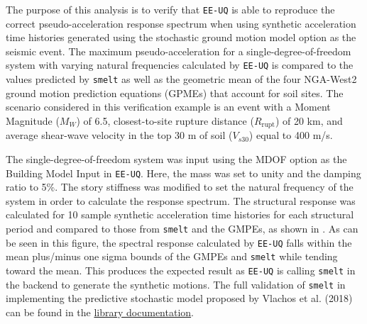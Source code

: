 The purpose of this analysis is to verify that \texttt{EE-UQ} is able
to reproduce the correct pseudo-acceleration response spectrum when
using synthetic acceleration time histories generated using the
stochastic ground motion model option as the seismic event. The maximum
pseudo-acceleration for a single-degree-of-freedom system with varying
natural frequencies calculated by \texttt{EE-UQ} is compared to the
values predicted by \texttt{smelt} as well as the geometric mean
of the four NGA-West2 ground motion prediction equations (GPMEs)
that account for soil sites. The scenario considered in this verification
example is an event with a Moment Magnitude ($M_W$) of 6.5, closest-to-site
rupture distance ($R_{\textrm{rupt}}$) of 20 km, and average shear-wave velocity in the top
30 m of soil ($V_{s30}$) equal to 400 m/s.

The single-degree-of-freedom system was input using the MDOF option as
the Building Model Input in \texttt{EE-UQ}. Here, the mass was set to
unity and the damping ratio to 5\%. The story stiffness was modified
to set the natural frequency of the system in order to calculate the
response spectrum. The structural response was calculated for 10
sample synthetic acceleration time histories for each structural
period and compared to those from \texttt{smelt} and the GMPEs, as
shown in . As can be seen in this
figure, the spectral response calculated by \texttt{EE-UQ} falls
within the mean plus/minus one sigma bounds of the GMPEs and
\texttt{smelt} while tending toward the mean. This produces the
expected result as \texttt{EE-UQ} is calling \texttt{smelt} in the
backend to generate the synthetic motions. The full validation of
\texttt{smelt} in implementing the predictive stochastic model
proposed by Vlachos et al. (2018) \cite{vlachos2018predictive} can be
found in the
\href{https://github.com/NHERI-SimCenter/smelt}{library
  documentation}.

